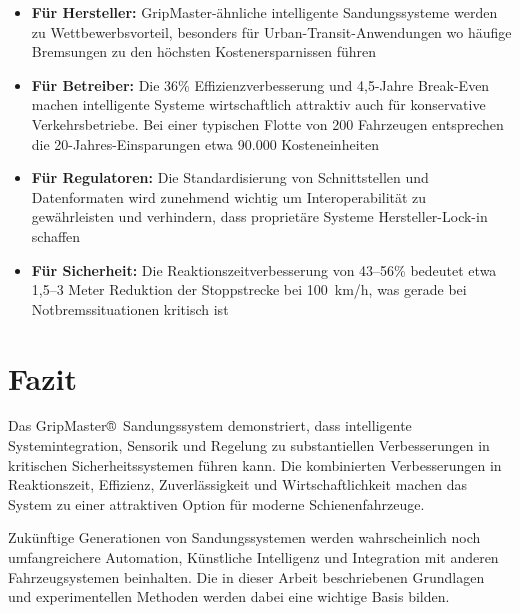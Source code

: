 \documentclass[a4paper,12pt]{article}
\theoremstyle{definition}
\begin{document}
\begin{itemize}
	\item \textbf{Für Hersteller:} GripMaster-ähnliche intelligente Sandungssysteme werden zu Wettbewerbsvorteil, besonders für Urban-Transit-Anwendungen wo häufige Bremsungen zu den höchsten Kostenersparnissen führen
	
	\item \textbf{Für Betreiber:} Die 36\% Effizienzverbesserung und 4,5-Jahre Break-Even machen intelligente Systeme wirtschaftlich attraktiv auch für konservative Verkehrsbetriebe. Bei einer typischen Flotte von 200 Fahrzeugen entsprechen die 20-Jahres-Einsparungen etwa 90.000 Kosteneinheiten
	
	\item \textbf{Für Regulatoren:} Die Standardisierung von Schnittstellen und Datenformaten wird zunehmend wichtig um Interoperabilität zu gewährleisten und verhindern, dass proprietäre Systeme Hersteller-Lock-in schaffen
	
	\item \textbf{Für Sicherheit:} Die Reaktionszeitverbesserung von 43--56\% bedeutet etwa 1,5--3 Meter Reduktion der Stoppstrecke bei 100~km/h, was gerade bei Notbremssituationen kritisch ist
\end{itemize}

\section{Fazit}

Das GripMaster®~Sandungssystem demonstriert, dass intelligente Systemintegration, Sensorik und Regelung zu substantiellen Verbesserungen in kritischen Sicherheitssystemen führen kann. Die kombinierten Verbesserungen in Reaktionszeit, Effizienz, Zuverlässigkeit und Wirtschaftlichkeit machen das System zu einer attraktiven Option für moderne Schienenfahrzeuge.


Zukünftige Generationen von Sandungssystemen werden wahrscheinlich noch umfangreichere Automation, Künstliche Intelligenz und Integration mit anderen Fahrzeugsystemen beinhalten. Die in dieser Arbeit beschriebenen Grundlagen und experimentellen Methoden werden dabei eine wichtige Basis bilden.
\end{document}
